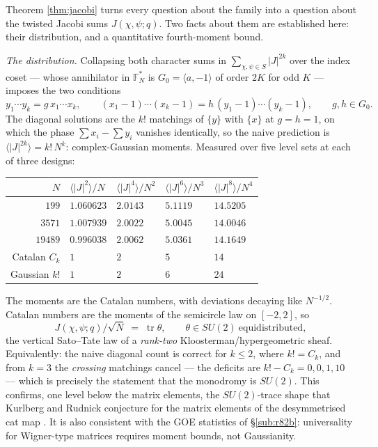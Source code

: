 \documentclass[11pt,reqno]{amsart}
\theoremstyle{definition}
\newcommand{\FF}{\mathbb{F}}
\begin{document}
Theorem \ref{thm:jacobi} turns every question about the family into a question
about the twisted Jacobi sums $J(\chi,\psi;q)$.  Two facts about them are
established here: their distribution, and a quantitative fourth-moment bound.

\emph{The distribution.}  Collapsing both character sums in
$\sum_{\chi,\psi\in S}|J|^{2k}$ over the index coset --- whose annihilator in
$\FF_N^*$ is $G_0=\langle a,-1\rangle$ of order $2K$ for odd $K$ --- imposes the
two conditions
\[
  y_1\cdots y_k=g\,x_1\cdots x_k,\qquad
  (x_1-1)\cdots(x_k-1)=h\,(y_1-1)\cdots(y_k-1),
  \qquad g,h\in G_0 .
\]
The diagonal solutions are the $k!$ matchings of $\{y\}$ with $\{x\}$ at
$g=h=1$, on which the phase $\sum x_i-\sum y_i$ vanishes identically, so the
naive prediction is $\langle|J|^{2k}\rangle=k!\,N^k$: complex-Gaussian moments.
Measured over five level sets at each of three designs:
\begin{center}\small
\begin{tabular}{rllll}
\toprule
$N$ & $\langle|J|^2\rangle/N$ & $\langle|J|^4\rangle/N^2$ & $\langle|J|^6\rangle/N^3$ & $\langle|J|^8\rangle/N^4$\\
\midrule
$199$ & $1.060623$ & $2.0143$ & $5.1119$ & $14.5205$\\
$3571$ & $1.007939$ & $2.0022$ & $5.0045$ & $14.0046$\\
$19489$ & $0.996038$ & $2.0062$ & $5.0361$ & $14.1649$\\
\midrule
Catalan $C_k$ & $1$ & $2$ & $5$ & $14$\\
Gaussian $k!$ & $1$ & $2$ & $6$ & $24$\\
\bottomrule
\end{tabular}
\end{center}
The moments are the Catalan numbers, with deviations decaying like $N^{-1/2}$.
Catalan numbers are the moments of the semicircle law on $[-2,2]$, so
\[
  J(\chi,\psi;q)/\sqrt N \;=\; \operatorname{tr}\theta,
  \qquad \theta\in SU(2)\ \text{equidistributed},
\]
the vertical Sato--Tate law of a \emph{rank-two} Kloosterman/hypergeometric
sheaf.  Equivalently: the naive diagonal count is correct for $k\le2$, where
$k!=C_k$, and from $k=3$ the \emph{crossing} matchings cancel --- the deficits
are $k!-C_k=0,0,1,10$ --- which is precisely the statement that the monodromy is
$SU(2)$.  This confirms, one level below the matrix elements, the
$SU(2)$-trace shape that Kurlberg and Rudnick conjecture for the matrix elements
of the desymmetrised cat map \cite{KR2003}.  It is also consistent with the GOE
statistics of \S\ref{sub:r82b}: universality for Wigner-type matrices requires
moment bounds, not Gaussianity.
\end{document}
